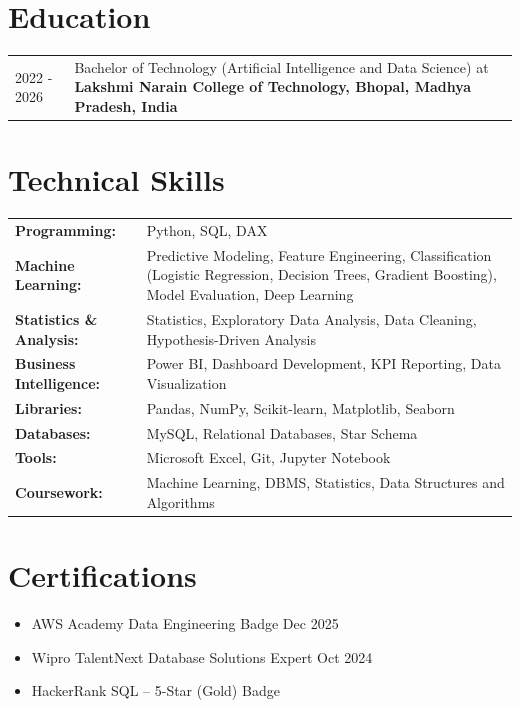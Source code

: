 \documentclass[a4paper,10pt]{article}
\begin{document}
\section{Education}
\begin{tabularx}{\linewidth}{@{}l X@{}}
2022 - 2026 & Bachelor of Technology (Artificial Intelligence and Data Science) at \textbf{Lakshmi Narain College of Technology, Bhopal, Madhya Pradesh, India} \\
\end{tabularx}

\section{Technical Skills}
\begin{tabularx}{\linewidth}{@{}l X@{}}
\textbf{Programming:} & Python, SQL, DAX \\
\textbf{Machine Learning:} & Predictive Modeling, Feature Engineering, Classification (Logistic Regression, Decision Trees, Gradient Boosting), Model Evaluation, Deep Learning \\
\textbf{Statistics \& Analysis:} & Statistics, Exploratory Data Analysis, Data Cleaning, Hypothesis-Driven Analysis \\
\textbf{Business Intelligence:} & Power BI, Dashboard Development, KPI Reporting, Data Visualization \\
\textbf{Libraries:} & Pandas, NumPy, Scikit-learn, Matplotlib, Seaborn \\
\textbf{Databases:} & MySQL, Relational Databases, Star Schema \\
\textbf{Tools:} & Microsoft Excel, Git, Jupyter Notebook \\
\textbf{Coursework:} & Machine Learning, DBMS, Statistics, Data Structures and Algorithms \\
\end{tabularx}

\section{Certifications}
\begin{itemize}[leftmargin=1em, itemsep=1pt, label=--, nosep]
    \item AWS Academy Data Engineering Badge \hfill Dec 2025
    \item Wipro TalentNext Database Solutions Expert \hfill Oct 2024
    \item HackerRank SQL -- 5-Star (Gold) Badge
\end{itemize}
\end{document}
